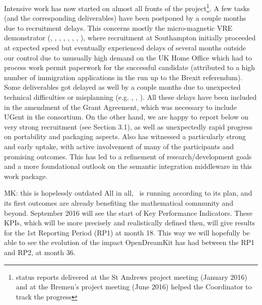 Intensive work has now started on almost all fronts of the project\footnote{status reports
  delivered at the St Andrews project meeting (January 2016) and at the Bremen's project
  meeting (June 2016) helped the Coordinator to track the progress}. A few tasks (and the corresponding
deliverables) have been postponed by a couple months due to recruitment delays. This
concerns mostly the micro-magnetic VRE demonstrator
(,
, ,
,
, ,
, ), where recruitment at Southampton initially proceeded at
expected speed but eventually experienced delays of several months outside our control due
to unusually high demand on the UK Home Office which had to process work permit paperwork
for the successful candidate (attributed to a high number of immigration applications in
the run up to the Brexit referendum). Some deliverables got delayed as well by a couple
months due to unexpected technical difficulties or misplanning
(e.g. , ,
). All these delays have been included in the amendment of
the Grant Agreement, which was necessary to include UGent in the consortium. On the other hand, we are happy to report below on
very strong recruitment (see Section 3.1), as well as unexpectedly rapid progress on
portability and packaging aspects. Also  has witnessed a particularly
strong and early uptake, with active involvement of many of the participants and promising
outcomes. This has led to a refinement of research/development goals and a more
foundational outlook on the semantic integration middleware in this work package.

\begin{oldpart}{MK: this is hopelessly outdated}
  All in all, \ODK\ is running according to its plan, and its first outcomes are already
  benefiting the mathematical community and beyond. September 2016 will see the start of
  Key Performance Indicators.  These KPIs, which will be more precisely and realistically
  defined then, will give results for the 1st Reporting Period (RP1) at month 18.  This
  way we will hopefully be able to see the evolution of the impact OpenDreamKit has had
  between the RP1 and RP2, at month 36.
\end{oldpart}

